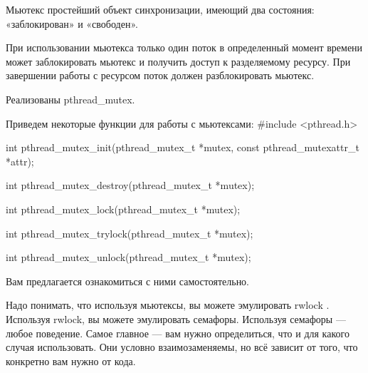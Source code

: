 \begin{defi}{Мьютекс}
	простейший объект синхронизации, имеющий два состояния: «заблокирован» и «свободен».
\end{defi}

При использовании мьютекса только один поток в определенный момент времени может заблокировать мьютекс и получить доступ к разделяемому ресурсу. При завершении работы с ресурсом поток должен разблокировать мьютекс. 

Реализованы pthread\_mutex. 

\begin{CCode}{Приведем некоторые функции для работы с мьютексами:}
	#include <pthread.h>

	int pthread_mutex_init(pthread_mutex_t *mutex, 
            const pthread_mutexattr_t *attr);
	
	int pthread_mutex_destroy(pthread_mutex_t *mutex);

	int pthread_mutex_lock(pthread_mutex_t *mutex);

	int pthread_mutex_trylock(pthread_mutex_t *mutex);

	int pthread_mutex_unlock(pthread_mutex_t *mutex); \end{CCode}

Вам предлагается ознакомиться с ними самостоятельно.

Надо понимать, что используя мьютексы, вы можете эмулировать rwlock . Используя rwlock, вы можете эмулировать семафоры. Используя семафоры --- любое поведение. Самое главное --- вам нужно определиться, что и для какого случая использовать. Они условно взаимозаменяемы, но всё зависит от того, что конкретно вам нужно от кода.
